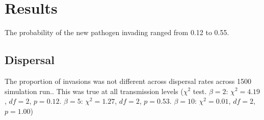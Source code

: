 
\clearpage
\section{Results}


The probability of the new pathogen invading ranged from 0.12 to 0.55.



\subsection{Dispersal}


The proportion of invasions was not different across dispersal rates across 1500 simulation run.. 
This was true at all transmission levels ($\chi^2$ test. $\beta = 2$: $\chi^2 = 4.19$, $df = 2$, $p = 0.12$. $\beta = 5$: $\chi^2 = 1.27$, $df = 2$, $p = 0.53$. $\beta = 10$: $\chi^2 = 0.01$, $df = 2$, $p = 1.00$)


